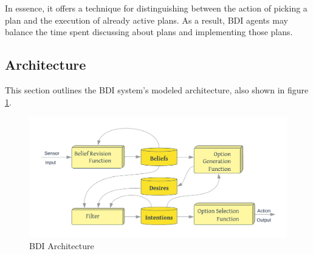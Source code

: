 \vspace{.5cm}

In essence, it offers a technique for distinguishing between the action of picking a plan and the execution of already active plans. As a result, \ac{BDI} agents may balance the time spent discussing about plans and implementing those plans.

\subsection{Architecture}

This section outlines the \ac{BDI} system's modeled architecture, also shown in figure \ref{BDI Architecture}.

    \begin{figure}[h]
    \centering
      \includegraphics[width=12cm]{includes/figures/BDI_arch.png}
      \caption{\ac{BDI} Architecture \cite{bdiarch}}
      \label{BDI Architecture}
    \end{figure}
    
